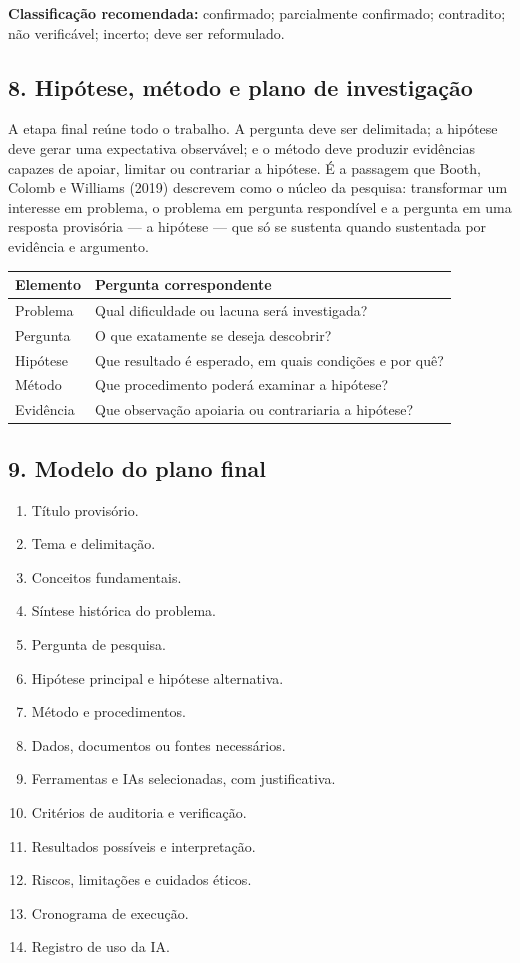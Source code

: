 \documentclass[11pt,a4paper]{article}
\begin{document}
\textbf{Classificação recomendada:} confirmado; parcialmente confirmado; contradito; não
verificável; incerto; deve ser reformulado.

\subsection*{8. Hipótese, método e plano de investigação}

A etapa final reúne todo o trabalho. A pergunta deve ser delimitada; a hipótese deve gerar
uma expectativa observável; e o método deve produzir evidências capazes de apoiar, limitar
ou contrariar a hipótese. É a passagem que Booth, Colomb e Williams (2019) descrevem como o
núcleo da pesquisa: transformar um interesse em problema, o problema em pergunta respondível
e a pergunta em uma resposta provisória --- a hipótese --- que só se sustenta quando
sustentada por evidência e argumento.

{\small
\begin{tabular}{|p{}|p{}|}
\hline
\textbf{Elemento} & \textbf{Pergunta correspondente} \\
\hline
Problema & Qual dificuldade ou lacuna será investigada? \\
\hline
Pergunta & O que exatamente se deseja descobrir? \\
\hline
Hipótese & Que resultado é esperado, em quais condições e por quê? \\
\hline
Método & Que procedimento poderá examinar a hipótese? \\
\hline
Evidência & Que observação apoiaria ou contrariaria a hipótese? \\
\hline
\end{tabular}
}

\subsection*{9. Modelo do plano final}

\begin{enumerate}
\item Título provisório.
\item Tema e delimitação.
\item Conceitos fundamentais.
\item Síntese histórica do problema.
\item Pergunta de pesquisa.
\item Hipótese principal e hipótese alternativa.
\item Método e procedimentos.
\item Dados, documentos ou fontes necessários.
\item Ferramentas e IAs selecionadas, com justificativa.
\item Critérios de auditoria e verificação.
\item Resultados possíveis e interpretação.
\item Riscos, limitações e cuidados éticos.
\item Cronograma de execução.
\item Registro de uso da IA.
\end{enumerate}
\end{document}
